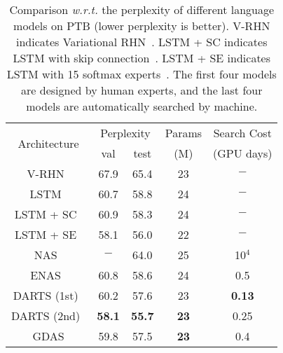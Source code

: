 \documentclass[10pt,twocolumn,letterpaper]{article}
\begin{document}
\begin{table}[t!]
\centering
\setlength{\tabcolsep}{4pt}
\begin{tabular}{| c | c | c | c | c |} \hline\hline

\multirow{2}{*}{Architecture}          & \multicolumn{2}{c|}{Perplexity} & Params & Search Cost \\\cline{2-3}
                                       &     val     &      test        & (M)    & (GPU days) \\\hline
V-RHN~\cite{zilly2017recurrent}        &   67.9      &   65.4           & 23     &   $-$      \\
LSTM~\cite{merity2018regularizing}     &   60.7      &   58.8           & 24     &   $-$      \\
LSTM + SC~\cite{merity2018regularizing}&   60.9      &   58.3           & 24     &   $-$       \\
LSTM + SE~\cite{yang2018breaking}      &   58.1      &   56.0           & 22     &   $-$       \\
\hline\hline
NAS~\cite{zoph2017NAS}                 &    $-$      &   64.0           & 25     & 10$^{4}$    \\
ENAS~\cite{pmlr-v80-pham18a}           &    60.8     &   58.6           & 24     & 0.5         \\
DARTS (1st)~\cite{liu2019darts}        &    60.2     &   57.6           & 23     & \textbf{0.13} \\
DARTS (2nd)~\cite{liu2019darts}        &\textbf{58.1}&\textbf{55.7}     &\textbf{23}&0.25 \\\hline
GDAS                                   &    59.8     &      57.5        &\textbf{23}&    0.4     \\\hline
\hline
\end{tabular}
\vspace{2mm}
\caption{
Comparison \textit{w.r.t.} the perplexity of different language models on PTB (lower perplexity is better).
V-RHN indicates Variational RHN~\cite{zilly2017recurrent}.
LSTM + SC indicates LSTM with skip connection~\cite{merity2018regularizing}.
LSTM + SE indicates LSTM with 15 softmax experts~\cite{yang2018breaking}.
The first four models are designed by human experts, and the last four models are automatically searched by machine.
}
\vspace{-2mm}
\label{table:PTB}
\end{table}
\end{document}
